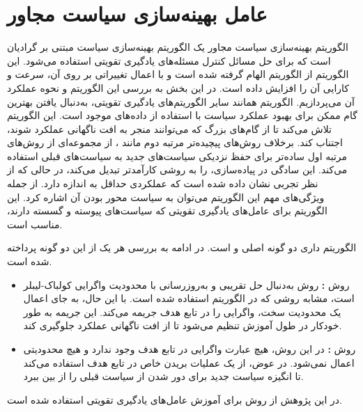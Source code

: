 \section{عامل بهینه‌سازی سیاست مجاور}
الگوریتم 
بهینه‌سازی سیاست مجاور
 یک الگوریتم بهینه‌سازی سیاست مبتنی بر گرادیان است که برای حل مسائل کنترل مسئله‌های یادگیری تقویتی استفاده می‌شود. این الگوریتم از الگوریتم 
 الهام گرفته شده است و با اعمال تغییراتی بر روی آن، سرعت و کارایی آن را افزایش داده است. در این بخش به بررسی این الگوریتم و نحوه عملکرد آن می‌پردازیم.
 الگوریتم  همانند سایر الگوریتم‌های یادگیری تقویتی، به‌دنبال یافتن بهترین گام ممکن برای بهبود عملکرد سیاست با استفاده از داده‌های موجود است. این الگوریتم تلاش می‌کند تا از گام‌های بزرگ که می‌توانند منجر به افت ناگهانی عملکرد شوند، اجتناب کند.
 برخلاف روش‌های پیچیده‌تر مرتبه دوم مانند 
 ، 
  از مجموعه‌ای از روش‌های مرتبه اول ساده‌تر برای حفظ نزدیکی سیاست‌های جدید به سیاست‌های قبلی استفاده می‌کند. این سادگی در پیاده‌سازی،  را به روشی کارآمدتر تبدیل می‌کند، در حالی که از نظر تجربی نشان داده شده است که عملکردی حداقل به اندازه  دارد.
  از جمله ویژگی‌های مهم این الگوریتم می‌توان به سیاست محور بودن آن اشاره کرد.
  این الگوریتم برای عامل‌های یادگیری تقویتی که سیاست‌های پیوسته و گسسته دارند، مناسب است.


  الگوریتم
  داری دو گونه اصلی 
    و
    است. در ادامه به بررسی هر یک از این دو گونه پرداخته شده است.
    \begin{itemize}
        \item
         روش\textbf{
         :}
        روش
         به‌دنبال حل تقریبی و به‌روز‌رسانی با 
        محدودیت واگرایی کولباک-لیبلر
است، مشابه روشی که در الگوریتم  استفاده شده است.
 با این حال، به جای اعمال یک محدودیت سخت،
  واگرایی  را در تابع هدف جریمه می‌کند. این جریمه به طور خودکار در طول آموزش تنظیم می‌شود تا از افت ناگهانی عملکرد جلوگیری کند.
    \item
     روش\textbf{
    :}
    در این روش، هیچ عبارت واگرایی  در تابع هدف وجود ندارد و هیچ محدودیتی اعمال نمی‌شود. در عوض،
     از یک عملیات بریدن خاص در تابع هدف استفاده می‌کند تا انگیزه سیاست جدید برای دور شدن از سیاست قبلی را از بین ببرد.    
    \end{itemize}
    در این پژوهش از روش 
    برای آموزش عامل‌های یادگیری تقویتی استفاده شده است.

